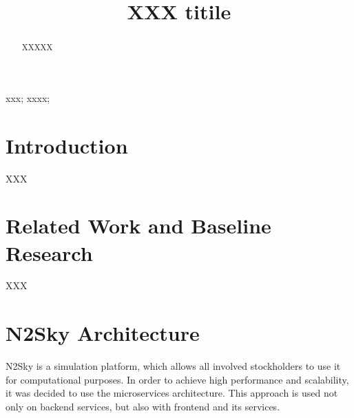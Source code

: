 \documentclass[10pt, conference, compsocconf]{IEEEtran}
\begin{document}
\title{XXX titile}


\author{
\and
{}
\and
{}
}


\maketitle


\begin{abstract}
XXXXX

\end{abstract}

\begin{IEEEkeywords}
xxx; xxxx;

\end{IEEEkeywords}



\IEEEpeerreviewmaketitle



\section{Introduction}
XXX


\section{Related Work and Baseline Research}

XXX


\section{N2Sky Architecture}
\label{N2Sky Architecture}

N2Sky is a simulation platform, which allows all involved stockholders to use it for computational purposes. In order to achieve high performance and scalability, it was decided to use the microservices architecture. This approach is used not only on backend services, but also with frontend and its services. 
\end{document}
